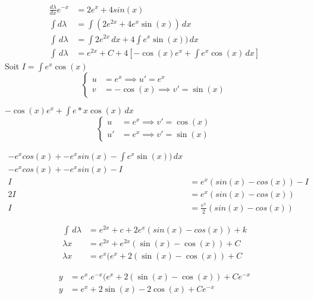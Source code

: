 		\begin{align*}
			\frac{d\lambda}{dx}e^{-x} &= 2e^x + 4sin(x) \\
			\int d\lambda &= \int (2e^{2x} + 4e^x \sin(x)) \, dx \\
			\int \, d\lambda &= \int 2e^{2x} \, dx + 4\int e^x \sin(x)) \, dx \\
			\int \, d\lambda &= e^{2x} + C + 4 [-\cos(x)e^x + \int e^x\cos(x)\, dx]
		\end{align*}
		Soit $I = \int e^x\cos(x)\ $ \\
		\[
		\left\{
		\begin{aligned}
			u &= e^x \implies u'= e^x  \\
			v &= -\cos(x) \implies v' = \sin(x)
		\end{aligned}
		\right.
		\]
		
		$-\cos(x)e^x + \int e*x\cos(x)\, dx$
		\[
		\left\{
		\begin{aligned}
			u &= e^x \implies v'= \cos(x)  \\
			u' &= e^x \implies v' = \sin(x)
		\end{aligned}
		\right.
		\]
		
		\begin{align*}
			-e^xcos(x) + -e^xsin(x) - \int e^x \sin(x)) \, dx \\
			-e^xcos(x) + -e^xsin(x) - I \\
			I &= e^x(sin(x) - cos(x)) - I \\
			2I &= e^x(sin(x) - cos(x)) \\
			I &= \frac{e^x}{2}(sin(x) - cos(x)) 
		\end{align*}
		
		\begin{align*}
			\int \, d\lambda &= e^{2x} + c + 2e^x(sin(x) - cos(x)) + k \\
			\lambda x &= e^{2x} + e^{2x} (\sin(x) - \cos(x)) + C \\
			\lambda x &= e^{x} (e^{x} + 2(\sin(x) - \cos(x)) + C
		\end{align*}
		
		\begin{align*}
			y &= e^x.e^{-x} (e^{x} + 2(\sin(x) - \cos(x)) + Ce^{-x} \\
			y &= e^x + 2\sin(x) - 2\cos(x) + Ce^{-x}
		\end{align*}
